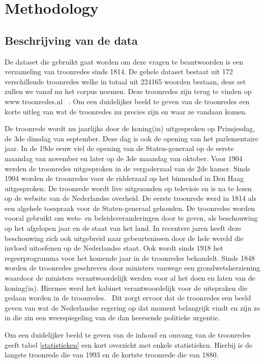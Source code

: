 \section{Methodology}
\label{sec:meth}


\subsection{Beschrijving van de data}
De dataset die gebruikt gaat worden om deze vragen te beantwoorden is een verzameling van troonredes sinds 1814. De gehele dataset bestaat uit 172 verschillende troonredes welke in totaal uit 224165 woorden bestaan, deze set zullen we vanaf nu het corpus noemen. Deze troonredes zijn terug te vinden op www.troonredes.nl~\citep{troonredes} . Om een duidelijker beeld te geven van de troonredes een korte uitleg van wat de troonredes nu precies zijn en waar ze vandaan komen. 

De troonrede wordt nu jaarlijks door de koning(in) uitgesproken op Prinsjesdag, de 3de dinsdag van september. Deze dag is ook de opening van het parlementaire jaar. In de 19de eeuw viel de opening van de Staten-generaal op de eerste maandag van november en later op de 3de maandag van oktober. Voor 1904 werden de troonredes uitgesproken in de vergaderzaal van de 2de kamer. Sinds 1904 worden de troonredes voor de ridderzaal op het binnenhof in Den Haag uitgesproken. De troonrede wordt live uitgezonden op televisie en is na te lezen op de website van de Nederlandse overheid. De eerste troonrede werd in 1814 als een algehele toespraak voor de Staten-generaal gehouden. De troonredes worden vooral gebruikt om wets- en beleidsveranderingen door te geven, als beschouwing op het afgelopen jaar en de staat van het land. In recentere jaren heeft deze beschouwing zich ook uitgebreid naar gebeurtenissen door de hele wereld die invloed uitoefenen op de Nederlandse staat. Ook wordt sinds 1918 het regeerprogramma voor het komende jaar in de troonredes behandelt. Sinds 1848 worden de troonredes geschreven door ministers vanwege een grondwetsherziening waardoor de ministers verantwoordelijk werden voor al het doen en laten van de koning(in). Hiermee werd het kabinet verantwoordelijk voor de uitspraken die gedaan worden in de troonredes.~\citep{overheid} Dit zorgt ervoor dat de troonredes een beeld geven van wat de Nederlandse regering op dat moment belangrijk vindt en zijn ze in die zin een weerspiegeling van de dan heersende politieke urgentie.

Om een duidelijker beeld te geven van de inhoud en omvang van de troonredes geeft tabel \ref{statistieken} een kort overzicht met enkele statistieken. Hierbij is de langste troonrede die van 1993 en de kortste troonrede die van 1880.

